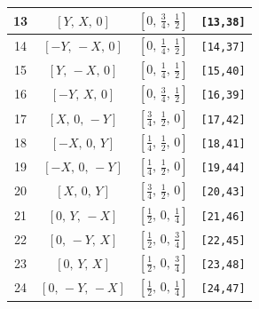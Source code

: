 \documentclass[fleqn,8pt]{jsarticle}
\begin{document}
\begin{longtable}{cccc}
13 & $\left[ Y,\, X,\, 0 \right]$ & $\left[ 0,\, \frac{3}{4},\, \frac{1}{2} \right]$ & {\tt [13,38]} \\ \hline
14 & $\left[ - Y,\, - X,\, 0 \right]$ & $\left[ 0,\, \frac{1}{4},\, \frac{1}{2} \right]$ & {\tt [14,37]} \\ \hline
15 & $\left[ Y,\, - X,\, 0 \right]$ & $\left[ 0,\, \frac{1}{4},\, \frac{1}{2} \right]$ & {\tt [15,40]} \\ \hline
16 & $\left[ - Y,\, X,\, 0 \right]$ & $\left[ 0,\, \frac{3}{4},\, \frac{1}{2} \right]$ & {\tt [16,39]} \\ \hline
17 & $\left[ X,\, 0,\, - Y \right]$ & $\left[ \frac{3}{4},\, \frac{1}{2},\, 0 \right]$ & {\tt [17,42]} \\ \hline
18 & $\left[ - X,\, 0,\, Y \right]$ & $\left[ \frac{1}{4},\, \frac{1}{2},\, 0 \right]$ & {\tt [18,41]} \\ \hline
19 & $\left[ - X,\, 0,\, - Y \right]$ & $\left[ \frac{1}{4},\, \frac{1}{2},\, 0 \right]$ & {\tt [19,44]} \\ \hline
20 & $\left[ X,\, 0,\, Y \right]$ & $\left[ \frac{3}{4},\, \frac{1}{2},\, 0 \right]$ & {\tt [20,43]} \\ \hline
21 & $\left[ 0,\, Y,\, - X \right]$ & $\left[ \frac{1}{2},\, 0,\, \frac{1}{4} \right]$ & {\tt [21,46]} \\ \hline
22 & $\left[ 0,\, - Y,\, X \right]$ & $\left[ \frac{1}{2},\, 0,\, \frac{3}{4} \right]$ & {\tt [22,45]} \\ \hline
23 & $\left[ 0,\, Y,\, X \right]$ & $\left[ \frac{1}{2},\, 0,\, \frac{3}{4} \right]$ & {\tt [23,48]} \\ \hline
24 & $\left[ 0,\, - Y,\, - X \right]$ & $\left[ \frac{1}{2},\, 0,\, \frac{1}{4} \right]$ & {\tt [24,47]} \\
\end{longtable}
\renewcommand{\arraystretch}{1.2}
\end{document}
